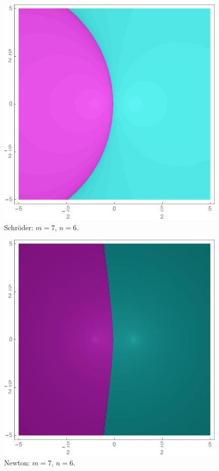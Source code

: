 \begin{figure}[H]
\vspace{0.5cm}

\begin{minipage}[t]{0.45\textwidth}
\centering
\includegraphics[width=0.98\textwidth]{fuentes/articulo-cuadraticos/imagenes/sch_m_7n_6.jpg}
\small Schröder: $m=7, \, n=6.$
\end{minipage}\hfill
\begin{minipage}[t]{0.45\textwidth}
\centering
\includegraphics[width=0.98\textwidth]{fuentes/articulo-cuadraticos/imagenes/newton_m_7n_6.jpg}
\small Newton: $m=7, \, n=6.$
\end{minipage}


\end{figure}
